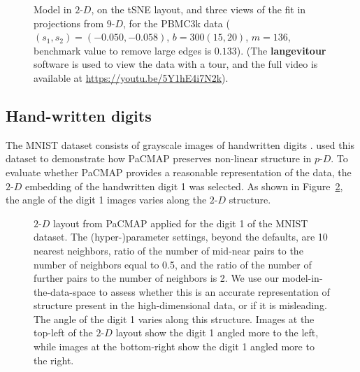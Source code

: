 \documentclass[
  12pt]{article}
\newcommand\pD{$p\text{-}D$}
\newcommand\gD{$2\text{-}D$}
\begin{document}
\begin{figure}[H]


\caption{\label{fig-pbmc2-sc}Model in \(2\text{-}D\), on the tSNE
layout, and three views of the fit in projections from \(9\text{-}D\),
for the PBMC3k data (\((s_1,  s_2) = (-0.050,  -0.058)\),
\(b = 300   (15,  20)\), \(m = 136\), benchmark value to remove large
edges is \(0.133\)). (The \textbf{langevitour} software is used to view
the data with a tour, and the full video is available at
\url{https://youtu.be/5Y1hE4i7N2k}).}

\end{figure}%

\subsection{Hand-written digits}\label{hand-written-digits}

The MNIST dataset consists of grayscale images of handwritten digits
\citep{lecun2010}. \citet{yingfan2021} used this dataset to demonstrate
how PaCMAP preserves non-linear structure in \pD{}. To evaluate whether
PaCMAP provides a reasonable representation of the data, the \gD{}
embedding of the handwritten digit 1 was selected. As shown in
Figure~\ref{fig-pacmap-author}, the angle of the digit 1 images varies
along the \gD{} structure.

\begin{figure}[H]


\caption{\label{fig-pacmap-author}\(2\text{-}D\) layout from PaCMAP
applied for the digit 1 of the MNIST dataset. The (hyper-)parameter
settings, beyond the defaults, are 10 nearest neighbors, ratio of the
number of mid-near pairs to the number of neighbors equal to 0.5, and
the ratio of the number of further pairs to the number of neighbors is
2. We use our model-in-the-data-space to assess whether this is an
accurate representation of structure present in the high-dimensional
data, or if it is misleading. The angle of the digit 1 varies along this
structure. Images at the top-left of the \(2\text{-}D\) layout show the
digit 1 angled more to the left, while images at the bottom-right show
the digit 1 angled more to the right.}

\end{figure}%
\end{document}
